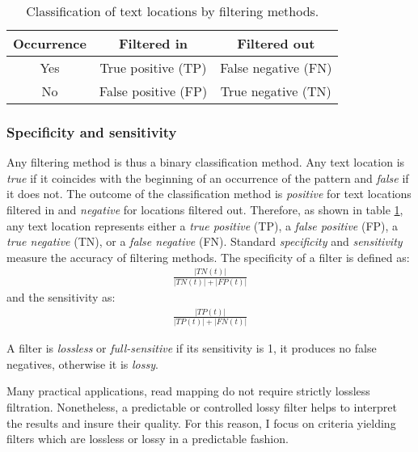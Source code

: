 \begin{table}[h]
\begin{center}
\caption[Classification of text locations by filtering methods]{Classification of text locations by filtering methods.}
\begin{tabular}{ccc}
\toprule
Occurrence & Filtered in & Filtered out\\
\midrule
Yes & True positive (TP) & False negative (FN) \\
No & False positive (FP) & True negative (TN) \\
\bottomrule
\end{tabular}
\label{tab:filter:accuracy}
\end{center}
\end{table}

\subsubsection{Specificity and sensitivity}

Any filtering method is thus a binary classification method.
Any text location is \emph{true} if it coincides with the beginning of an occurrence of the pattern and \emph{false} if it does not.
The outcome of the classification method is \emph{positive} for text locations filtered in and \emph{negative} for locations filtered out.
Therefore, as shown in table \ref{tab:filter:accuracy}, any text location represents either a \emph{true positive} (TP), a \emph{false positive} (FP), a \emph{true negative} (TN), or a \emph{false negative} (FN).
Standard \emph{specificity} and \emph{sensitivity} measure the accuracy of filtering methods.
The specificity of a filter is defined as:
\begin{eqnarray}
\frac{|TN(t)|}{|TN(t)| + |FP(t)|}
\end{eqnarray}
and the sensitivity as:
\begin{eqnarray}
\frac{|TP(t)|}{|TP(t)| + |FN(t)|}
\end{eqnarray}

\begin{definition}
A filter is \emph{lossless} or \emph{full-sensitive} if its sensitivity is 1, \ie it produces no false negatives, otherwise it is \emph{lossy}.
\end{definition}
Many practical applications, \eg read mapping do not require strictly lossless filtration.
Nonetheless, a predictable or controlled lossy filter helps to interpret the results and insure their quality.
For this reason, I focus on criteria yielding filters which are lossless or lossy in a predictable fashion.


